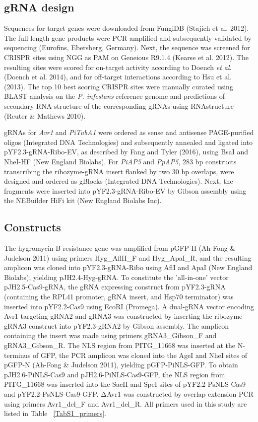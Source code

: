 \documentclass[onecolumn, 11pt,openany]{memoir}
\begin{document}
\begin{multicols}{2}
\begin{footnotesize}
\subsection{gRNA design}
Sequences for target genes were downloaded from FungiDB (Stajich et al. 2012). The full-length gene products were PCR amplified and subsequently validated by sequencing (Eurofins, Ebersberg, Germany). Next, the sequence was screened for CRISPR sites using NGG as PAM on Geneious R9.1.4 (Kearse et al. 2012). The resulting sites were scored for on-target activity according to Doench \textit{et al}. (Doench et al. 2014), and for off-target interactions according to Hsu et al. (2013). The top 10 best scoring CRISPR sites were manually curated using BLAST analysis on the \textit{P. infestans }reference genome and predictions of secondary RNA structure of the corresponding gRNAs using RNAstructure (Reuter \& Mathews 2010).

gRNAs for \textit{Avr1} and \textit{PiTubA1} were ordered as sense and antisense PAGE-purified oligos (Integrated DNA Technologies) and subsequently annealed and ligated into pYF2.3-gRNA-Ribo-EV, as described by Fang and Tyler (2016), using BsaI and NheI-HF (New England Biolabs). For \textit{PiAP5 }and \textit{PpAP5}, 283 bp constructs transcribing the ribozyme-gRNA insert flanked by two 30 bp overlaps, were designed and ordered as gBlocks (Integrated DNA Technologies). Next, the fragments were inserted into pYF2.3-gRNA-Ribo-EV by Gibson assembly using the NEBuilder HiFi kit (New England Biolabs Inc).

\subsection{Constructs}
The hygromycin-B resistance gene was amplified from pGFP-H (Ah-Fong \& Judelson 2011) using primers Hyg\_AflII\_F and Hyg\_ApaI\_R, and the resulting amplicon was cloned into pYF2.3-gRNA-Ribo using AflI and ApaI (New England Biolabs), yielding pJH2.4-Hyg-gRNA. To constitute the 'all-in-one' vector pJH2.5-Cas9-gRNA, the gRNA expressing construct from pYF2.3-gRNA (containing the RPL41 promoter, gRNA insert, and Hsp70 terminator) was inserted into pYF2.2-Cas9 using EcoRI (Promega). A dual-gRNA vector encoding Avr1-targeting gRNA2 and gRNA3 was constructed by inserting the ribozyme-gRNA3 construct into pYF2.3-gRNA2 by Gibson assembly. The amplicon containing the insert was made using primers gRNA3\_Gibson\_F and gRNA3\_Gibson\_R. The NLS region from PITG\_11668 was inserted at the N-terminus of GFP, the PCR amplicon was cloned into the AgeI and NheI sites of pGFP-N (Ah-Fong \& Judelson 2011), yielding pGFP-PiNLS-GFP. To obtain pJH2.6-PiNLS-Cas9 and pJH2.6-PiNLS-Cas9-GFP, the NLS region from PITG\_11668 was inserted into the SacII and SpeI sites of pYF2.2-PsNLS-Cas9 and pYF2.2-PsNLS-Cas9-GFP. ΔAvr1 was constructed by overlap extension PCR using primers Avr1\_del\_F and Avr1\_del\_R. All primers used in this study are listed in Table ~\ref{TabS1_primers}. 


\end{footnotesize}
\end{multicols}
\end{document}
